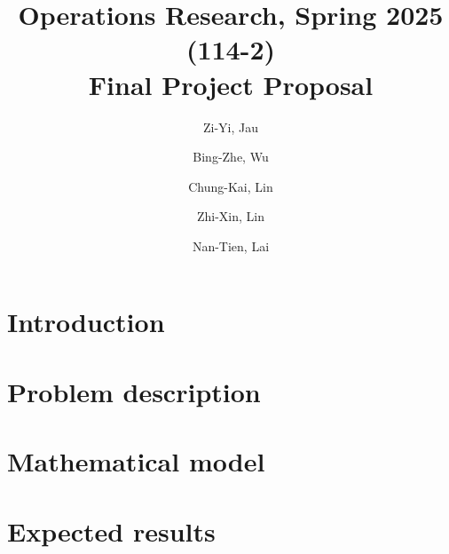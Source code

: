 \documentclass[11pt,a4paper]{article}
\title{Operations Research, Spring 2025 (114-2) \\ Final Project Proposal}
\author{Zi-Yi, Jau} %
\author{Bing-Zhe, Wu} %
\author{Chung-Kai, Lin} %
\author{Zhi-Xin, Lin} %
\author{Nan-Tien, Lai} %
\affil{Department of Information Management, National Taiwan University}
\begin{document}
\section{Introduction}
\section{Problem description}
\section{Mathematical model}
\section{Expected results}
\end{document}
